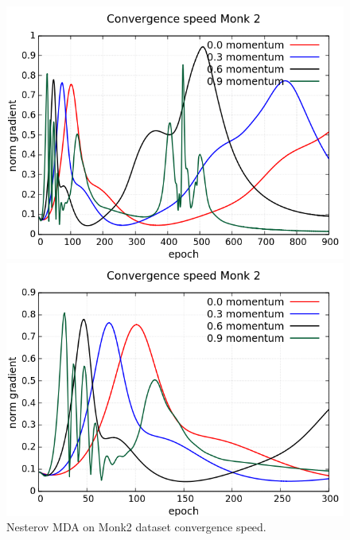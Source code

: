 \begin{figure}[H]
	\centering
	\begin{minipage}[t]{0.5\linewidth}
		\includegraphics[width=\linewidth]{data/MGD/Monk2/NM/Monk2_NMGD_CS_standard.png}
	\end{minipage}%
	\begin{minipage}[t]{0.5\linewidth}
		\includegraphics[width=\linewidth]{data/MGD/Monk2/NM/Monk2_NMGD_CS_zoom.png}
	\end{minipage}
	\caption{Nesterov MDA on Monk2 dataset convergence speed.}
\end{figure}
